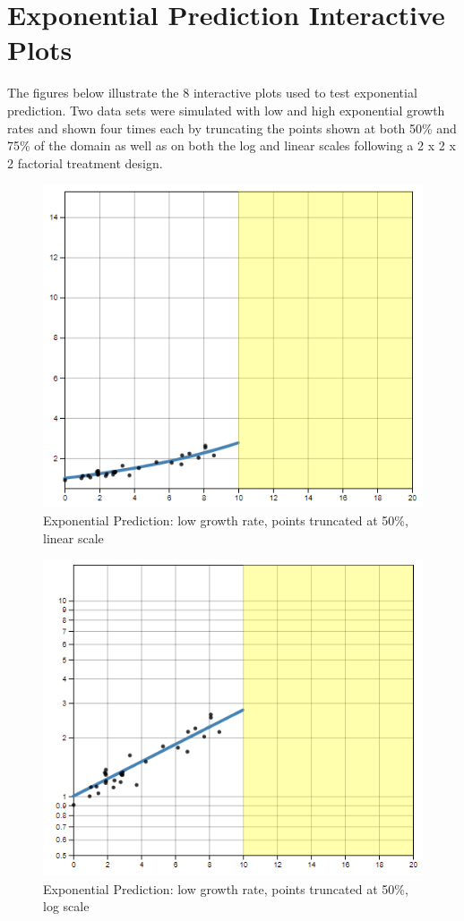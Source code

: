 \documentclass[print]{nuthesis}
\begin{document}
\hypertarget{exponential-prediction-plots}{%
\chapter{Exponential Prediction Interactive Plots}\label{exponential-prediction-plots}}

The figures below illustrate the 8 interactive plots used to test exponential prediction.
Two data sets were simulated with low and high exponential growth rates and shown four times each by truncating the points shown at both 50\% and 75\% of the domain as well as on both the log and linear scales following a 2 x 2 x 2 factorial treatment design.

\begin{figure}[tbp]

{\centering \includegraphics[width=0.65\linewidth,]{images/02-you-draw-it/low-10-linear} 

}

\caption[Exponential prediction plot (low; 50\%; linear)]{Exponential Prediction: low growth rate, points truncated at 50\%, linear scale}\label{fig:low-10-linear}
\end{figure}

\begin{figure}[tbp]

{\centering \includegraphics[width=0.65\linewidth,]{images/02-you-draw-it/low-10-log} 

}

\caption[Exponential prediction plot (low; 50\%; log)]{Exponential Prediction: low growth rate, points truncated at 50\%, log scale}\label{fig:low-10-log}
\end{figure}
\end{document}
